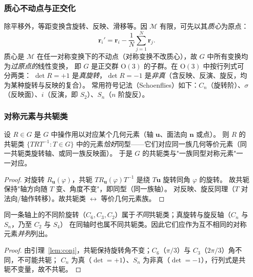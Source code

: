 \subsubsection{质心不动点与正交化}
除平移外，等距变换含旋转、反映、滑移等。因 $\mathcal M$ 有限，可先以其\emph{质心}为原点：
\begin{equation}
  \mathbf r_i'=\mathbf r_i-\frac{1}{N}\sum_{j=1}^{N}\mathbf r_j .
\end{equation}
质心是 $\mathcal M$ 在任一对称变换下的不动点（对称变换不改质心），故 $G$ 中所有变换均为\emph{过原点的}线性变换，
即 $G$ 是正交群 $\mathrm{O}(3)$ 的子群。在 $\mathrm{O}(3)$ 中按行列式可分两类：
$\det R=+1$ 是\emph{真旋转}，$\det R=-1$ 是\emph{非真}（含反映、反演、旋反，均为某种旋转与反映的复合）。
常用符号记法（Schoenflies）如下：$C_n$（旋转阶）、$\sigma$（反映面）、$i$（反演，即 $S_2$）、$S_n$（$n$ 阶旋反）。

\subsubsection{对称元素与共轭类}
\begin{lemma}\label{lem:conj}
  设 $R\in G$ 是 $G$ 中操作用以对应某个几何元素（轴 $\mathbf u$、面法向 $\mathbf n$ 或点）。
  则 $R$ 的共轭类 $\{TRT^{-1}: T\in G\}$ 中的元素\emph{恰好}同型——它们对应同一族几何等价元素（同一共轭类旋转轴、或同一族反映面）。
  于是 $G$ 的共轭类与"一族同型对称元素"一一对应。
\end{lemma}
\begin{proof}
  对旋转 $R_{\mathbf u}(\varphi)$，共轭 $T R_{\mathbf u}(\varphi)T^{-1}$ 是绕 $T\mathbf u$ 旋转同角 $\varphi$ 的旋转。
  故共轭保持"轴方向随 $T$ 变、角度不变"，即同型（同一族轴）。
  对反映、旋反同理（$T$ 对法向/轴作转移）。故共轭类 $\leftrightarrow$ 等价几何元素族。\qedhere
\end{proof}

\begin{corollary}[同轴拆列与子阶独立的群论依据]\label{cor:split}
  同一条轴上的不同阶旋转（$C_6,C_3,C_2$）属于\emph{不同}共轭类；真旋转与旋反轴（$C_n$ 与 $S_n$，乃至 $C_2$ 与 $S_4$）
  在同轴时也属不同共轭类。因此它们应作为互不相同的对称元素\emph{并列}列出。
\end{corollary}
\begin{proof}
  由引理~\ref{lem:conj}，共轭保持旋转角不变；$C_6$（$\pi/3$）与 $C_3$（$2\pi/3$）角不同，不可能共轭；
  $C_n$ 为真（$\det=+1$）、$S_n$ 为非真（$\det=-1$），行列式是共轭不变量，故不共轭。\qedhere
\end{proof}

